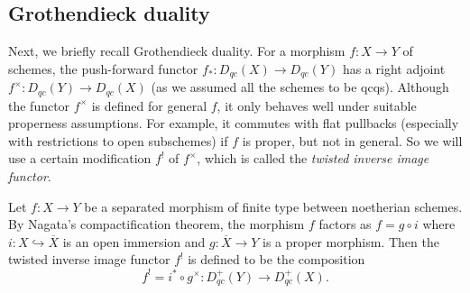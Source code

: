 \documentclass[12pt]{amsart}
\numberwithin{equation}{section}
\theoremstyle{plain}
\theoremstyle{definition}
\begin{document}
\subsection{Grothendieck duality}
Next, we briefly recall Grothendieck duality.
For a morphism $f \colon X \to Y$ of schemes,
the push-forward functor $f_* \colon D_{qc}(X) \to D_{qc}(Y)$ has a right adjoint $f^\times \colon D_{qc}(Y) \to D_{qc}(X)$ (as we assumed all the schemes to be qcqs).
Although the functor $f^\times$ is defined for general $f$, it only behaves well under suitable properness assumptions.
For example, it commutes with flat pullbacks (especially with restrictions to open subschemes) if $f$ is proper, but not in general.
So we will use a certain modification $f^!$ of $f^\times$, which is called the \emph{twisted inverse image functor}.

Let $f \colon X \to Y$ be a separated morphism of finite type between noetherian schemes.
By Nagata's compactification theorem, the morphism $f$ factors as $f = g \circ i$ where $i \colon X \hookrightarrow \overline{X}$ is an open immersion and $g \colon \overline{X} \to Y$ is a proper morphism.
Then
the twisted inverse image functor $f^!$ is defined to be the composition
\begin{equation}
    f^! = i^* \circ g^\times \colon D_{qc}^+(Y) \to D_{qc}^+(X).
\end{equation}
\end{document}
